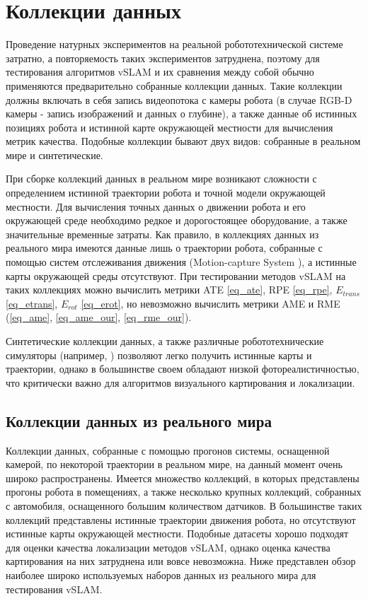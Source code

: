 \documentclass{mipt-thesis-ms}
\begin{document}
	\section{Коллекции данных}
	
	 Проведение натурных экспериментов на реальной робототехнической системе затратно, а повторяемость таких экспериментов затруднена, поэтому для тестирования алгоритмов vSLAM и их сравнения между собой обычно применяются предварительно собранные коллекции данных. Такие коллекции должны включать в себя запись видеопотока с камеры робота (в случае RGB-D камеры - запись изображений и данных о глубине), а также данные об истинных позициях робота и истинной карте окружающей местности для вычисления метрик качества. Подобные коллекции бывают двух видов: собранные в реальном мире и синтетические.
	 
	 При сборке коллекций данных в реальном мире возникают сложности с определением истинной траектории робота и точной модели окружающей местности. Для вычисления точных данных о движении робота и его окружающей среде необходимо редкое и дорогостоящее оборудование, а также значительные временные затраты. Как правило, в коллекциях данных из реального мира имеются данные лишь о траектории робота, собранные с помощью систем отслеживания движения (Motion-capture System \cite{kurihara2002optical}), а истинные карты окружающей среды отсутствуют. При тестировании методов vSLAM на таких коллекциях можно вычислить метрики ATE \ref{eq_ate}, RPE \ref{eq_rpe}, $E_{trans}$ \ref{eq_etrans}, $E_{rot}$ \ref{eq_erot}, но невозможно вычислить метрики AME и RME (\ref{eq_ame}, \ref{eq_ame_our}, \ref{eq_rme_our}).
	 
	 Синтетические коллекции данных, а также различные робототехнические симуляторы (например, \cite{koenig2004design} \cite{rooban2021coppeliasim}) позволяют легко получить истинные карты и траектории, однако в большинстве своем обладают низкой фотореалистичностью, что критически важно для алгоритмов визуального картирования и локализации.
	
	\subsection{Коллекции данных из реального мира}
	
	Коллекции данных, собранные с помощью прогонов системы, оснащенной камерой, по некоторой траектории в реальном мире, на данный момент очень широко распространены. Имеется множество коллекций, в которых представлены прогоны робота в помещениях, а также несколько крупных коллекций, собранных с автомобиля, оснащенного большим количеством датчиков. В большинстве таких коллекций представлены истинные траектории движения робота, но отсутствуют истинные карты окружающей местности. Подобные датасеты хорошо подходят для оценки качества локализации методов vSLAM, однако оценка качества картирования на них затруднена или вовсе невозможна. Ниже представлен обзор наиболее широко используемых наборов данных из реального мира для тестирования vSLAM.
	
\end{document}
